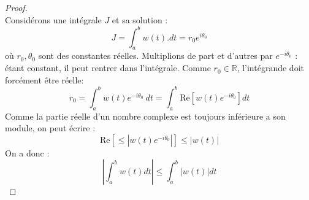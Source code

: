     \begin{proof}\ \\
    Considérons une intégrale $J$ et sa solution :
    \begin{equation}
    J = \int_a^b w(t).dt = r_0e^{i\theta_0}
    \end{equation}
    où $r_0, \theta_0$ sont des constantes réelles. Multiplions de part et d'autres par 
    $e^{-i\theta_0}$ : étant constant, il peut rentrer dans l'intégrale. Comme $r_0 \in
    \mathbb{R}$, l'intégrande doit forcément être réelle:
    \begin{equation}
    r_0 = \int_a^b w(t)e^{-i\theta_0}\ dt = \int_a^b \text{Re}[w(t)e^{-i\theta_0}]dt
    \end{equation}
    Comme la partie réelle d'un nombre complexe est toujours inférieure a son module, 
    on peut écrire :
    \begin{equation}
    \text{Re}[ \leq |w(t)e^{-i\theta_0}|] \leq |w(t)|
    \end{equation}
    On a donc :
    \begin{equation}
    \left|\int_a^b w(t) dt\right| \leq \int_a^b |w(t)|dt
    \end{equation}
    \end{proof}
